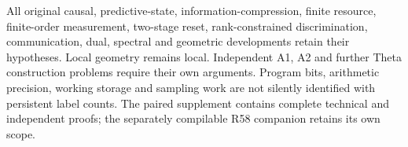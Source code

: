 All original causal, predictive-state, information-compression, finite
resource, finite-order measurement, two-stage reset, rank-constrained
discrimination, communication, dual, spectral and geometric developments
retain their hypotheses.  Local geometry remains local.  Independent
A1, A2 and further Theta construction problems require their own
arguments.  Program bits, arithmetic precision, working storage and
sampling work are not silently identified with persistent label counts.
The paired supplement contains complete technical and independent
proofs; the separately compilable R58 companion retains its own scope.

\renewcommand{\bibliofont}{\footnotesize\setlength{\baselineskip}{10.8pt}}


